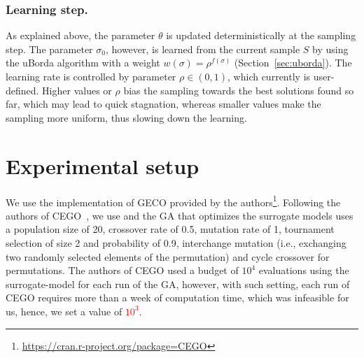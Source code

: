 \documentclass[runningheads]{llncs}
\begin{document}
\subsubsection{Learning step.}
As explained above, the parameter $\theta$ is updated deterministically at the
sampling step. The parameter $\sigma_0$, however, is learned from the current
sample $S$ by using the uBorda algorithm with a weight
$w(\sigma)=\rho^{f(\sigma)}$ (Section~\ref{sec:uborda}). The learning rate
is controlled by parameter $\rho \in (0,1)$, which currently is user-defined. Higher values or $\rho$ bias the sampling towards the best solutions found so far, which may lead to quick stagnation, whereas smaller values make the sampling more uniform, thus slowing down the learning.










\section{Experimental setup}

We use the implementation of GECO provided by the
authors\footnote{\url{https://cran.r-project.org/package=CEGO}}. Following the
authors of CEGO~\citep{ZaeStoFriFisNauBar2014,ZaeStoBar2014:ppsn}, we use and
the GA that optimizes the surrogate models uses a population size of 20,
crossover rate of 0.5, mutation rate of 1, tournament selection of size 2 and
probability of 0.9, interchange mutation (i.e., exchanging two randomly
selected elements of the permutation) and cycle crossover for permutations. The
authors of CEGO used a budget of $10^4$ evaluations using the surrogate-model
for each run of the GA, however, with such setting, each run of CEGO requires
more than a week of computation time, which was infeasible for us, hence, we
set a value of \textcolor{red}{$10^3$}.
\end{document}

